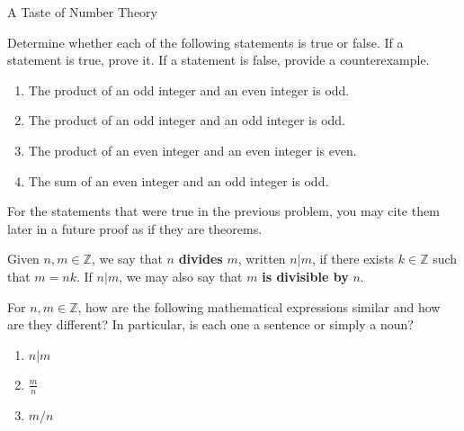 \begin{section}{A Taste of Number Theory}
\begin{problem}
Determine whether each of the following statements is true or false.  If a statement is true, prove it. If a statement is false, provide a counterexample.
\begin{enumerate}[label=\textrm{(\alph*)}]
\item The product of an odd integer and an even integer is odd.
\item The product of an odd integer and an odd integer is odd.
\item The product of an even integer and an even integer is even.
\item The sum of an even integer and an odd integer is odd.
\end{enumerate}
\end{problem}

For the statements that were true in the previous problem, you may cite them later in a future proof as if they are theorems.


\begin{definition}
Given $n,m\in\mathbb{Z}$, we say that $n$ \textbf{divides} $m$, written $\boxed{n|m}$, if there exists $k\in\mathbb{Z}$ such that $m=nk$. If $n|m$, we may also say that $m$ \textbf{is divisible by} $n$.
\end{definition}

\begin{problem}
For $n,m\in\mathbb{Z}$, how are the following mathematical expressions similar and how are they different? In particular, is each one a sentence or simply a noun?
\begin{enumerate}[label=\textrm{(\alph*)}]
\item $n|m$
\item $\displaystyle \frac{m}{n}$
\item $m/n$
\end{enumerate}
\end{problem}


\end{section}
